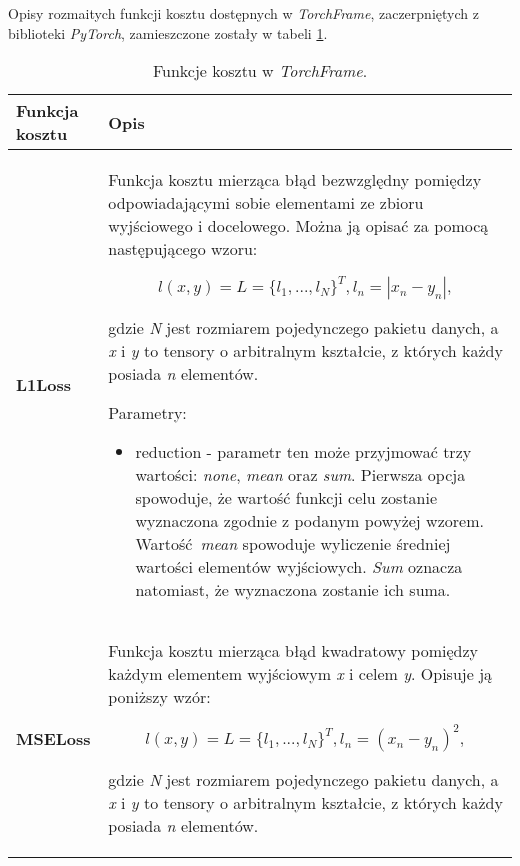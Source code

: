 \begin{enumerate}
    Opisy rozmaitych funkcji kosztu dostępnych w \textit{TorchFrame}, zaczerpniętych z biblioteki \textit{PyTorch},
    zamieszczone zostały w tabeli \ref{tab:cost_functions}.
 \begin{small}
    \begin{longtable}{ |m{2cm}|m{12cm}| }
      \caption{Funkcje kosztu w \textit{TorchFrame}.}
      \label{tab:cost_functions}
      \endfirsthead
      \endhead
     \hline
       \textbf{Funkcja \newline kosztu} & \textbf{Opis} \\

     \hline
       \textbf{L1Loss} &

       Funkcja kosztu mierząca błąd bezwzględny pomiędzy
       odpowiadającymi sobie elementami ze zbioru wyjściowego i docelowego.
       Można ją opisać za pomocą następującego wzoru:

       \begin{equation}
       l(x,y) = L = \{l_1,...,l_N\}^T, l_n = |x_n - y_n|,
     \end{equation}

       gdzie \textit{N} jest rozmiarem pojedynczego pakietu danych, a \textit{x} i
       \textit{y} to tensory o arbitralnym kształcie, z których każdy posiada
       \textit{n} elementów.

       Parametry:
       \begin{itemize}
       \item reduction - parametr ten może przyjmować trzy wartości: \textit{none},
       \textit{mean} oraz \textit{sum}. Pierwsza opcja spowoduje, że wartość funkcji
       celu zostanie wyznaczona zgodnie z podanym powyżej wzorem. Wartość \textit{mean}
       spowoduje wyliczenie średniej wartości elementów wyjściowych. \textit{Sum}
       oznacza natomiast, że wyznaczona zostanie ich suma.
       \end{itemize} \\

     \hline
       \textbf{MSELoss} &

       Funkcja kosztu mierząca błąd kwadratowy pomiędzy każdym elementem
       wyjściowym \textit{x} i celem \textit{y}. Opisuje ją poniższy wzór:

       \begin{equation}
       l(x,y) = L = \{l_1,...,l_N\}^T, l_n = (x_n - y_n)^2,
     \end{equation}

       gdzie \textit{N} jest rozmiarem pojedynczego pakietu danych, a \textit{x} i
       \textit{y} to tensory o arbitralnym kształcie, z których każdy posiada
       \textit{n} elementów.


\end{longtable}
\end{small}
\end{enumerate}

